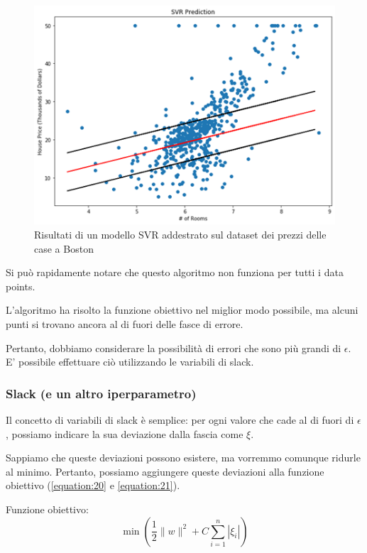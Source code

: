 \begin{figure}
    \centering
    \includegraphics[width=0.9\linewidth]{images/img103.png}
    \caption{Risultati di un modello SVR addestrato sul dataset dei prezzi delle case a Boston}
    \label{fig:image41}
\end{figure}


Si può rapidamente notare che questo algoritmo non funziona per tutti i data points. 

L'algoritmo ha risolto la funzione obiettivo nel miglior modo possibile, ma alcuni punti si trovano ancora al di fuori delle fasce di errore. 

Pertanto, dobbiamo considerare la possibilità di errori che sono più grandi di $\epsilon$. E' possibile effettuare ciò utilizzando le variabili di slack.

\subsubsection{Slack (e un altro iperparametro)}
Il concetto di variabili di slack è semplice: per ogni valore che cade al di fuori di $\epsilon$, possiamo indicare la sua deviazione dalla fascia come $\xi$.

Sappiamo che queste deviazioni possono esistere, ma vorremmo comunque ridurle al minimo. Pertanto, possiamo aggiungere queste deviazioni alla funzione obiettivo (\ref{equation:20} e \ref{equation:21}).

Funzione obiettivo:
\begin{equation}
        \min \left( \frac{1}{2} \| w \|^{2} + C \sum_{i=1}^{n} | \xi_i | \right)
        \label{equation:20}
\end{equation}

